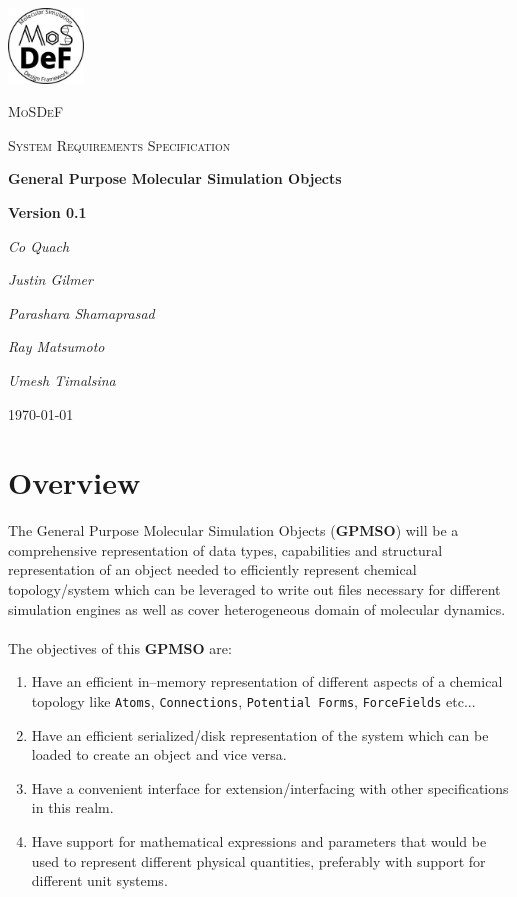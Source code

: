 \documentclass[12pt]{article}
\begin{document}
\begin{titlepage}
	\centering
	\includegraphics[width=0.15\textwidth]{docs/logo}\par\vspace{1cm}
	{\scshape\LARGE MoSDeF \par}
	\vspace{1cm}
	{\scshape\Large System Requirements Specification\par}
	\vspace{1.5cm}
	{\huge\bfseries General Purpose Molecular Simulation Objects\par}
	\vspace{1cm}
	{\huge\bfseries Version 0.1\par}
	\vspace{2cm}
	{\Large\itshape Co Quach\par}
	{\Large\itshape Justin Gilmer\par}
	{\Large\itshape Parashara Shamaprasad\par}
	{\Large\itshape Ray Matsumoto\par}
	{\Large\itshape Umesh Timalsina\par}

	\vfill

	{\large \today\par}
\end{titlepage}

{\centering \section*{Overview}}

The General Purpose Molecular Simulation Objects (\textbf{GPMSO}) will be a comprehensive representation of data types, capabilities and structural representation of an object needed to efficiently represent chemical topology/system which can be leveraged to write out files necessary for different simulation engines as well as cover heterogeneous domain of molecular dynamics. \\~\\
The objectives of this \textbf{GPMSO} are:
\begin{enumerate}
    \item Have an efficient in--memory representation of different aspects of a chemical topology like \texttt{Atoms}, \texttt{Connections}, \texttt{Potential Forms}, \texttt{ForceFields} etc...
    \item Have an efficient serialized/disk representation of the system which can be loaded to create an object and vice versa.
    \item Have a convenient interface for extension/interfacing with other specifications in this realm.
    \item Have support for mathematical expressions and parameters that would be used to represent different physical quantities, preferably with support for different unit systems.
\end{enumerate}
\end{document}
